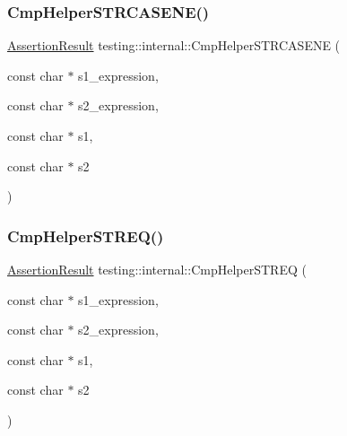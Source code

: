 \subsubsection{\texorpdfstring{Cmp\+Helper\+S\+T\+R\+C\+A\+S\+E\+N\+E()}{CmpHelperSTRCASENE()}}
{\footnotesize\ttfamily \hyperlink{classtesting_1_1_assertion_result}{Assertion\+Result} testing\+::internal\+::\+Cmp\+Helper\+S\+T\+R\+C\+A\+S\+E\+NE (\begin{DoxyParamCaption}\item[{const char $\ast$}]{s1\+\_\+expression,  }\item[{const char $\ast$}]{s2\+\_\+expression,  }\item[{const char $\ast$}]{s1,  }\item[{const char $\ast$}]{s2 }\end{DoxyParamCaption})}

\mbox{\label{namespacetesting_1_1internal_a711a396ed8f636ecd14a850a89d181b6}} 
\subsubsection{\texorpdfstring{Cmp\+Helper\+S\+T\+R\+E\+Q()}{CmpHelperSTREQ()}\hspace{0.1cm}{\footnotesize\ttfamily [1/2]}}
{\footnotesize\ttfamily \hyperlink{classtesting_1_1_assertion_result}{Assertion\+Result} testing\+::internal\+::\+Cmp\+Helper\+S\+T\+R\+EQ (\begin{DoxyParamCaption}\item[{const char $\ast$}]{s1\+\_\+expression,  }\item[{const char $\ast$}]{s2\+\_\+expression,  }\item[{const char $\ast$}]{s1,  }\item[{const char $\ast$}]{s2 }\end{DoxyParamCaption})}

\mbox{\label{namespacetesting_1_1internal_ad351878f87634853c4eb005fe9b169a8}} 
